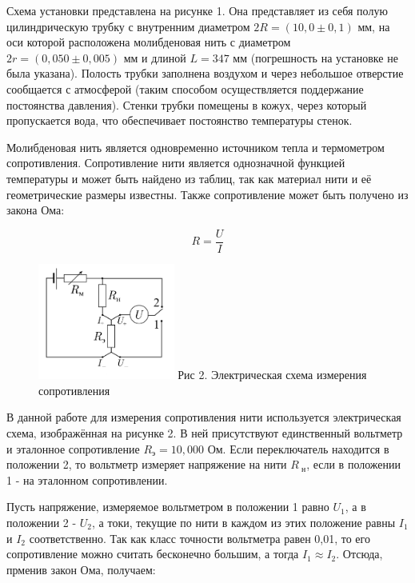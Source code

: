 \documentclass[15pt,a5paper,reqno]{article}
\begin{document}
    Схема установки представлена на рисунке 1. Она представляет из себя полую цилиндрическую трубку с внутренним диаметром $2R = (10,0 \pm 0,1)\text{ мм}$, на оси которой расположена молибденовая нить с диаметром $2r = (0,050 \pm 0,005)\text{ мм}$ и длиной $L = 347\text{ мм}$ (погрешность на установке не была указана). Полость трубки заполнена воздухом и через небольшое отверстие сообщается с атмосферой (таким способом осуществляется поддержание постоянства давления). Стенки трубки помещены в кожух, через который пропускается вода, что обеспечивает постоянство температуры стенок.
    
    Молибденовая нить является одновременно источником тепла и термометром сопротивления. Сопротивление нити является однозначной функцией температуры и может быть найдено из таблиц, так как материал нити и её геометрические размеры известны. Также сопротивление может быть получено из закона Ома:
    
    \begin{equation}
        R = \frac{U}{I}
    \end{equation}
    
    
    \begin{figure}
        \includegraphics[width=0.4\textwidth]{Рисунок 2. Электрическая схема.png}
        Рис 2. Электрическая схема измерения сопротивления
    \end{figure}
    
    В данной работе для измерения сопротивления нити используется электрическая схема, изображённая на рисунке 2. В ней присутствуют единственный вольтметр и эталонное сопротивление $R_{\text{э}} = 10,000\text{ Ом}$. Если переключатель находится в положении 2, то вольтметр измеряет напряжение на нити $R_{\text{ н}}$, если в положении 1 - на эталонном сопротивлении. 
    
    Пусть напряжение, измеряемое вольтметром в положении 1 равно $U_1$, а в положении 2 - $U_2$, а токи, текущие по нити в каждом из этих положение равны $I_1$ и $I_2$ соответственно. Так как класс точности вольтметра равен 0,01, то его сопротивление можно считать бесконечно большим, а тогда $I_1 \approx I_2$. Отсюда, прменив закон Ома, получаем:
    
\end{document}
